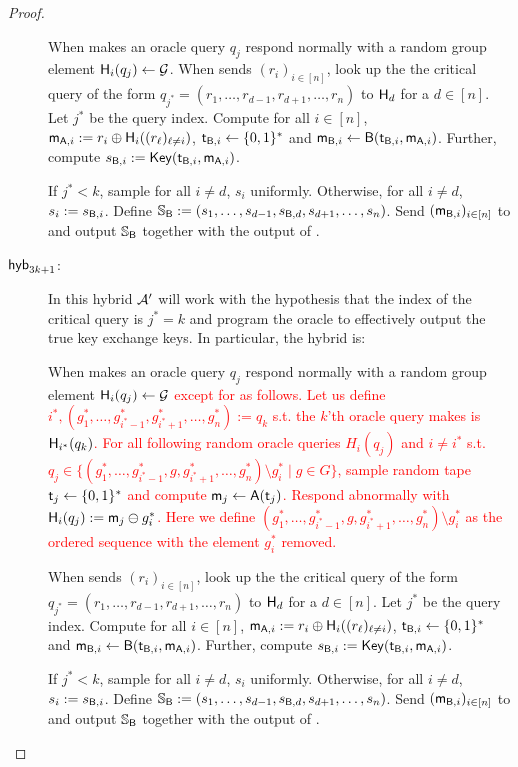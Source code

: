 \begin{proof}
\begin{description}
 When \Adv makes an oracle query $q_{j}$ respond normally with a random group element $\mathsf{H}_i(q_{j})\leftarrow\mathcal{G}$. When \Adv sends $(r_i)_{i\in[n]}$, look up the the critical query of the form $q_{j^*}= (r_1,\dots, r_{d-1},r_{d+1},\dots, r_{n})$ to $\mathsf{H}_d$ for a $d\in[n]$. Let $j^*$ be the query index. Compute for all $i\in[n]$, $\mathsf{m}_{\mathsf{A},i}:=r_i\oplus\mathsf{H}_i((r_\ell)_{\ell\neq i})$, $\mathsf{t}_{\mathsf{B},i}\leftarrow\{0,1\}^*$ and $\mathsf{m}_{\mathsf{B},i}\leftarrow\mathsf{B}(\mathsf{t}_{\mathsf{B},i},\mathsf{m}_{\mathsf{A},i})$. Further, compute $s_{\mathsf{B},i}:=\mathsf{Key}(\mathsf{t}_{\mathsf{B},i},\mathsf{m}_{\mathsf{A},i})$. 

If $j^*<k$, sample for all $i\neq d$, $s_i$ uniformly. Otherwise, for all $i\neq d$, $s_i:=s_{\mathsf{B},i}$.   Define $\mathsf{\mathbb S}_{\mathsf{B}}:=(s_{1},\dots, s_{d-1},s_{\mathsf{B},d},s_{d+1},\dots, s_{n})$.  
 Send $(\mathsf{m}_{\mathsf{B},i})_{i\in[n]}$ to \Adv and output $\mathsf{\mathbb S}_{\mathsf{B}}$ together with the output of \Adv. 
 
\item[$\mathsf{hyb}_{3k+1}$:] In this hybrid $\mathcal{A}'$ will work with the hypothesis that the index of the critical query is $j^*=k$ and program the oracle to effectively output the true key exchange keys. In particular, the hybrid is:

 When \Adv makes an oracle query $q_{j}$ respond normally with a random group element $\mathsf{H}_i(q_{j})\leftarrow\mathcal{G}$ \textcolor{red}{except for as follows. Let us define $i^*, (g^*_1,\dots, g^*_{i^*-1},g^*_{i^*+1},\dots, g^*_{n}):=q_k$ s.t. the $k$'th oracle query \Adv makes is $\mathsf{H}_{i^*}(q_{k})$. 
For all following random oracle queries $H_i(q_j)$ and $i\neq i^*$ s.t. $q_j\in \{ (g^*_1,\dots, g^*_{i^*-1}, g,g^*_{i^*+1},\dots, g^*_{n}) \setminus g^*_i \mid g\in G \}$, sample random tape $\mathsf{t}_j\leftarrow\{0,1\}^*$ and compute $\mathsf{m}_{j}\leftarrow\mathsf{A}(\mathsf{t}_j)$. 
Respond abnormally with $\mathsf{H}_i(q_j):=\mathsf{m}_j\ominus g^*_{i}$. Here we define $(g^*_1,\dots, g^*_{i^*-1}, g,g^*_{i^*+1},\dots, g^*_{n}) \setminus g^*_i$ as the ordered sequence with the element $g^*_i$ removed. }

When \Adv sends $(r_i)_{i\in[n]}$, look up the the critical query of the form $q_{j^*}= (r_1,\dots, r_{d-1},r_{d+1},\dots, r_{n})$ to $\mathsf{H}_d$ for a $d\in[n]$. Let $j^*$ be the query index. Compute for all $i\in[n]$, $\mathsf{m}_{\mathsf{A},i}:=r_i\oplus\mathsf{H}_i((r_\ell)_{\ell\neq i})$, $\mathsf{t}_{\mathsf{B},i}\leftarrow\{0,1\}^*$ and $\mathsf{m}_{\mathsf{B},i}\leftarrow\mathsf{B}(\mathsf{t}_{\mathsf{B},i},\mathsf{m}_{\mathsf{A},i})$. Further, compute $s_{\mathsf{B},i}:=\mathsf{Key}(\mathsf{t}_{\mathsf{B},i},\mathsf{m}_{\mathsf{A},i})$. 

If $j^*<k$, sample for all $i\neq d$, $s_i$ uniformly. Otherwise, for all $i\neq d$, $s_i:=s_{\mathsf{B},i}$.   Define $\mathsf{\mathbb S}_{\mathsf{B}}:=(s_{1},\dots, s_{d-1},s_{\mathsf{B},d},s_{d+1},\dots, s_{n})$.  
Send $(\mathsf{m}_{\mathsf{B},i})_{i\in[n]}$ to \Adv and output $\mathsf{\mathbb S}_{\mathsf{B}}$ together with the output of \Adv. 
 

\end{description}
\end{proof}
